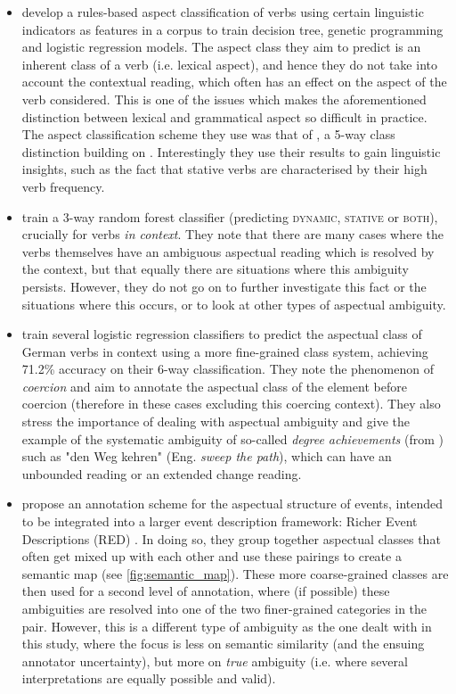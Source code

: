 \begin{itemize}
    \item \citet{siegel-mckeown-2000-learning} develop a rules-based aspect classification of verbs using certain linguistic indicators as features in a corpus to train decision tree, genetic programming and logistic regression models. The aspect class they aim to predict is an inherent class of a verb (i.e. lexical aspect), and hence they do not take into account the contextual reading, which often has an effect on the aspect of the verb considered. This is one of the issues which makes the aforementioned distinction between lexical and grammatical aspect so difficult in practice. The aspect classification scheme they use was that of \citet{moens-steedman-1988-temporal}, a 5-way class distinction building on \citet{vendler57}. Interestingly they use their results to gain linguistic insights, such as the fact that stative verbs are characterised by their high verb frequency.
    \item \citet{Friedrich2014AutomaticPO} train a 3-way random forest classifier (predicting \textsc{dynamic}, \textsc{stative} or \textsc{both}), crucially for verbs \emph{in context}. They note that there are many cases where the verbs themselves have an ambiguous aspectual reading which is resolved by the context, but that equally there are situations where this ambiguity persists. However, they do not go on to further investigate this fact or the situations where this occurs, or to look at other types of aspectual ambiguity.
    \item \citet{annotAndAutoClassOfAspectCat} train several logistic regression classifiers to predict the aspectual class of German verbs in context using a more fine-grained class system, achieving 71.2\% accuracy on their 6-way classification. They note the phenomenon of \emph{coercion} and aim to annotate the aspectual class of the element before coercion (therefore in these cases excluding this coercing context). They also stress the importance of dealing with aspectual ambiguity and give the example of the systematic ambiguity of so-called \emph{degree achievements} (from \citet{Kennedy2008MeasureOC}) such as "den Weg kehren" (Eng. \emph{sweep the path}), which can have an unbounded reading or an extended change reading.
    \item \citet{croft-etal-2016-annotation} propose an annotation scheme for the aspectual structure of events, intended to be integrated into a larger event description framework: Richer Event Descriptions (RED) \citep{styler2014a}. In doing so, they group together aspectual classes that often get mixed up with each other and use these pairings to create a semantic map (see \ref{fig:semantic_map}). These more coarse-grained classes are then used for a second level of annotation, where (if possible) these ambiguities are resolved into one of the two finer-grained categories in the pair. However, this is a different type of ambiguity as the one dealt with in this study, where the focus is less on semantic similarity (and the ensuing annotator uncertainty), but more on \emph{true} ambiguity (i.e. where several interpretations are equally possible and valid).


\end{itemize}
